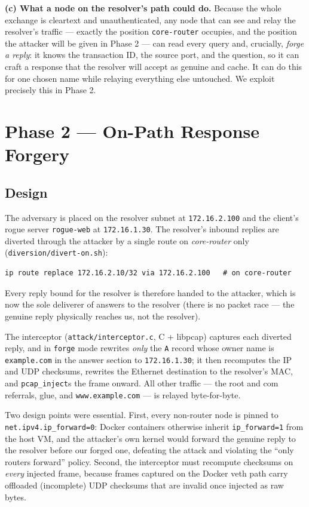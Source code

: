 \documentclass[11pt,a4paper]{article}
\begin{document}
\textbf{(c) What a node on the resolver's path could do.} Because the whole exchange is cleartext
and unauthenticated, any node that can see and relay the resolver's traffic --- exactly the
position \texttt{core-router} occupies, and the position the attacker will be given in Phase 2 ---
can read every query and, crucially, \emph{forge a reply}: it knows the transaction ID, the
source port, and the question, so it can craft a response that the resolver will accept as
genuine and cache. It can do this for one chosen name while relaying everything else untouched.
We exploit precisely this in Phase 2.


\section{Phase 2 --- On-Path Response Forgery}

\subsection{Design}
The adversary is placed on the resolver subnet at \texttt{172.16.2.100} and the client's rogue
server \texttt{rogue-web} at \texttt{172.16.1.30}. The resolver's inbound replies are diverted
through the attacker by a single route on \emph{core-router} only
(\texttt{diversion/divert-on.sh}):
\begin{lstlisting}
ip route replace 172.16.2.10/32 via 172.16.2.100   # on core-router
\end{lstlisting}
Every reply bound for the resolver is therefore handed to the attacker, which is now the sole
deliverer of answers to the resolver (there is no packet race --- the genuine reply physically
reaches us, not the resolver).

The interceptor (\texttt{attack/interceptor.c}, C + libpcap) captures each diverted reply, and in
\texttt{forge} mode rewrites \emph{only} the \texttt{A} record whose owner name is
\texttt{example.com} in the answer section to \texttt{172.16.1.30}; it then recomputes the IP and
UDP checksums, rewrites the Ethernet destination to the resolver's MAC, and \texttt{pcap\_inject}s
the frame onward. All other traffic --- the root and com referrals, glue, and
\texttt{www.example.com} --- is relayed byte-for-byte.

Two design points were essential. First, every non-router node is pinned to
\texttt{net.ipv4.ip\_forward=0}: Docker containers otherwise inherit \texttt{ip\_forward=1} from
the host VM, and the attacker's own kernel would forward the genuine reply to the resolver before
our forged one, defeating the attack and violating the ``only routers forward'' policy. Second,
the interceptor must recompute checksums on \emph{every} injected frame, because frames captured
on the Docker veth path carry offloaded (incomplete) UDP checksums that are invalid once injected
as raw bytes.
\end{document}
